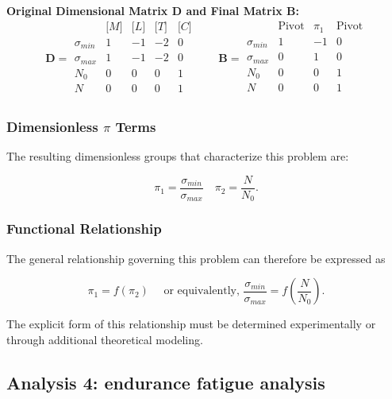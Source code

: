 \textbf{Original Dimensional Matrix $\mathbf{D}$ and Final Matrix $\mathbf{B}$:}
\begin{equation}
\mathbf{D} =
\begin{array}{r|rrrr}
& \text{[}M\text{]} & \text{[}L\text{]} & \text{[}T\text{]} & \text{[}C\text{]} \\
\hline
\sigma_{min} & 1 & -1 & -2 & 0 \\
\sigma_{max} & 1 & -1 & -2 & 0 \\
N_0 & 0 & 0 & 0 & 1 \\
N & 0 & 0 & 0 & 1 \\
\end{array}
\qquad
\mathbf{B} =
\begin{array}{r|rrr}
& \text{Pivot} & \pi_1 & \text{Pivot} \\
\hline
\sigma_{min} & 1 & -1 & 0 \\
\sigma_{max} & 0 & 1 & 0 \\
N_0 & 0 & 0 & 1 \\
N & 0 & 0 & 1 \\
\end{array}
\end{equation}

\subsubsection*{Dimensionless $\pi$ Terms}
The resulting dimensionless groups that characterize this problem are:

\begin{equation}
\pi_1 = \frac{\sigma_{min}}{\sigma_{max}}\quad
\pi_2 = \frac{N}{N_0}.
\end{equation}

\subsubsection*{Functional Relationship}
The general relationship governing this problem can therefore be expressed as

\begin{equation}
\pi_1 = f(\pi_2)\quad \mbox{ or equivalently, }\frac{\sigma_{min}}{\sigma_{max}}
=
f\left(\frac{N}{N_0}\right).
\end{equation}

The explicit form of this relationship must be determined experimentally or through additional theoretical modeling.

\subsection{Analysis 4: endurance fatigue analysis}
\label{sec:Endurance_Fatigue_Analysis}

